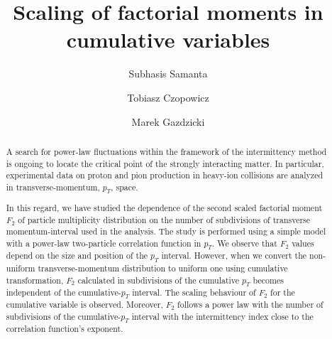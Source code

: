 \documentclass[floatfix,superscriptaddress,a4paper,
               nofootinbib,preprint]{revtex4}
\begin{document}
\iffalse
\fi


\title{Scaling of factorial moments in cumulative variables}

\author{Subhasis Samanta %
}

\author{Tobiasz Czopowicz}

\author{Marek Gazdzicki}



\begin{abstract}


A search for power-law fluctuations within the framework of the intermittency method is ongoing to locate the critical point of the strongly interacting matter. In particular, experimental data on proton and pion production in heavy-ion collisions are analyzed in transverse-momentum, $p_T$, space.

In this regard, we have studied the dependence of the second scaled factorial moment $F_2$ of particle multiplicity distribution on the number of subdivisions of transverse momentum-interval used in the analysis. The study is performed using a simple model with a power-law two-particle correlation
function in $p_T$. We observe that $F_2$ values depend on the size and position of the $p_T$ interval. However, when we convert the non-uniform transverse-momentum distribution to uniform one using cumulative transformation, $F_2$  calculated in subdivisions of the cumulative $p_T$
becomes independent of the cumulative-$p_T$ interval.
The scaling behaviour of $F_2$ for the cumulative variable is observed. Moreover, $F_2$ follows a power law with the number of subdivisions of the cumulative-$p_T$ interval with the intermittency index close to the correlation function's exponent.





\end{abstract}

\maketitle
\end{document}
